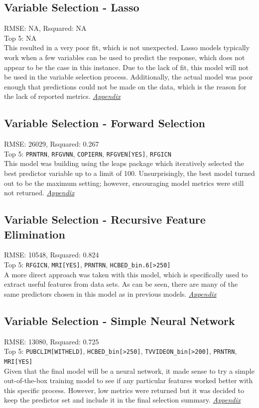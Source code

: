 \subsection{Variable Selection - Lasso}
RMSE: NA, Rsquared: NA\\
 Top 5: NA
\\[0.1in]
\indent This resulted in a very poor fit, which is not unexpected.  Lasso models typically work when a few variables can be used to predict the response, which does not appear to be the case in this instance.  Due to the lack of fit, this model will not be used in the variable selection process.  Additionally, the actual model was poor enough that predictions could not be made on the data, which is the reason for the lack of reported metrics.  \textit{\hyperref[appendix:electricity:l]{Appendix}}

\subsection{Variable Selection - Forward Selection}
RMSE: 26029, Rsquared: 0.267\\
Top 5: \lstinline{PRNTRN}, \lstinline{RFGVNN}, \lstinline{COPIERN}, \lstinline{RFGVEN[YES]}, \lstinline{RFGICN}
\\[0.1in]
\indent This model was building using the leaps package which iteratively selected the best predictor variable up to a limit of 100.  Unsurprisingly, the best model turned out to be the maximum setting; however, encouraging model metrics were still not returned.  \textit{\hyperref[appendix:electricity:lp]{Appendix}}

\subsection{Variable Selection - Recursive Feature Elimination}
RMSE: 10548, Rsquared: 0.824\\
Top 5: \lstinline{RFGICN}, \lstinline{MRI[YES]}, \lstinline{PRNTRN}, \lstinline{HCBED_bin.6[>250]}
\\[0.1in]
\indent A more direct approach was taken with this model, which is specifically used to extract useful features from data sets.  As can be seen, there are many of the same predictors chosen in this model as in previous models.  \textit{\hyperref[appendix:electricity:rfe]{Appendix}}

\subsection{Variable Selection - Simple Neural Network}
RMSE: 13080, Rsquared: 0.725\\
Top 5: \lstinline{PUBCLIM[WITHELD]}, \lstinline{HCBED_bin[>250]}, \lstinline{TVVIDEON_bin[>200]}, \lstinline{PRNTRN}, \lstinline{MRI[YES]}
\\[0.1in]
\indent Given that the final model will be a neural network, it made sense to try a simple out-of-the-box training model to see if any particular features worked better with this specific process.  However, low metrics were returned but it was decided to keep the predictor set and include it in the final selection summary.  \textit{\hyperref[appendix:electricity:snn]{Appendix}}
\newpage
